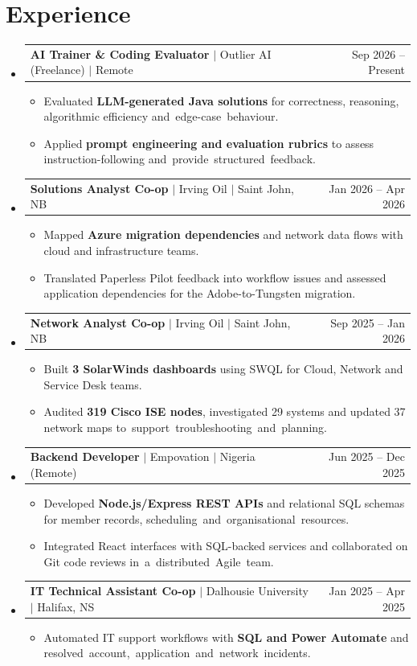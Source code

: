 \documentclass[letterpaper,11pt]{article}
\makeatletter
\newcommand{\resumeBodyFont}{
  \fontsize{10.2pt}{11.2pt}\selectfont
}
\newcommand{\resumeItem}[1]{
  \item{\resumeBodyFont #1}
}
\newcommand{\resumeSubheading}[4]{
  \item
    \begin{tabularx}{\textwidth}[t]
      {@{}>{\raggedright\arraybackslash}Xr@{}}
      \textbf{\textcolor{sectionblue}{#1}} $|$ #3 $|$ #4 & #2 \\
    \end{tabularx}
    \vspace{-10pt}
}
\newcommand{\resumeSubHeadingListStart}{
  \begin{itemize}[
    leftmargin=0in,
    label={},
    itemsep=7pt,
    topsep=1pt,
    parsep=0pt,
    partopsep=0pt
  ]
}
\newcommand{\resumeSubHeadingListEnd}{
  \end{itemize}
  \vspace{-3pt}
}
\newcommand{\resumeItemListStart}{
  \vspace{-2pt}
  \begin{itemize}[
    leftmargin=0.25in,
    itemsep=4pt,
    topsep=0pt,
    parsep=0pt,
    partopsep=0pt
  ]
}
\newcommand{\resumeItemListEnd}{
  \end{itemize}
  \vspace{-3pt}
}
\makeatother
\begin{document}
\section{Experience}
\resumeSubHeadingListStart
\resumeSubheading{AI Trainer \& Coding Evaluator}{Sep 2026 -- Present}{Outlier AI (Freelance)}{Remote}
\resumeItemListStart
  \resumeItem{Evaluated \textbf{LLM-generated Java solutions} for correctness, reasoning, algorithmic efficiency \mbox{and edge-case behaviour.}}
  \resumeItem{Applied \textbf{prompt engineering and evaluation rubrics} to assess instruction-following \mbox{and provide structured feedback.}}
\resumeItemListEnd
\resumeSubheading{Solutions Analyst Co-op}{Jan 2026 -- Apr 2026}{Irving Oil}{Saint John, NB}
\resumeItemListStart
  \resumeItem{Mapped \textbf{Azure migration dependencies} and network data flows with cloud and infrastructure teams.}
  \resumeItem{Translated Paperless Pilot feedback into workflow issues and assessed application dependencies for the Adobe-to-Tungsten migration.}
\resumeItemListEnd
\resumeSubheading{Network Analyst Co-op}{Sep 2025 -- Jan 2026}{Irving Oil}{Saint John, NB}
\resumeItemListStart
  \resumeItem{Built \textbf{3 SolarWinds dashboards} using SWQL for Cloud, Network and Service Desk teams.}
  \resumeItem{Audited \textbf{319 Cisco ISE nodes}, investigated 29 systems and updated 37 network maps \mbox{to support troubleshooting and planning.}}
\resumeItemListEnd
\resumeSubheading{Backend Developer}{Jun 2025 -- Dec 2025}{Empovation}{Nigeria (Remote)}
\resumeItemListStart
  \resumeItem{Developed \textbf{Node.js/Express REST APIs} and relational SQL schemas for member records, \mbox{scheduling and organisational resources.}}
  \resumeItem{Integrated React interfaces with SQL-backed services and collaborated on Git code reviews \mbox{in a distributed Agile team.}}
\resumeItemListEnd
\resumeSubheading{IT Technical Assistant Co-op}{Jan 2025 -- Apr 2025}{Dalhousie University}{Halifax, NS}
\resumeItemListStart
  \resumeItem{Automated IT support workflows with \textbf{SQL and Power Automate} and \mbox{resolved account, application and network incidents.}}
\resumeItemListEnd
\resumeSubHeadingListEnd
\end{document}
